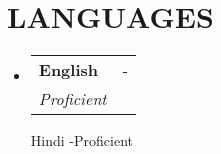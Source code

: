 \documentclass[a4paper,20pt]{article}
\makeatletter
\newcommand{\resumeSubheading}[4]{
  \vspace{-1pt}\item
    \begin{tabular*}{0.97\textwidth}{l@{\extracolsep{\fill}}r}
      \textbf{#1} & #2 \\
      \textit{#3} & \textit{#4} \\
    \end{tabular*}\vspace{-5pt}
}
\newcommand{\resumeSubHeadingListStart}{\begin{itemize}[leftmargin=*]}
\newcommand{\resumeSubHeadingListEnd}{\end{itemize}}
\makeatother
\begin{document}
\vspace{-5pt}
\section{LANGUAGES}
  \resumeSubHeadingListStart
	\resumeSubheading
    {English}{-}
    {Proficient}

    \resumeSubheading
    {Hindi}
    {-}{Proficient}

\resumeSubHeadingListEnd
\end{document}
